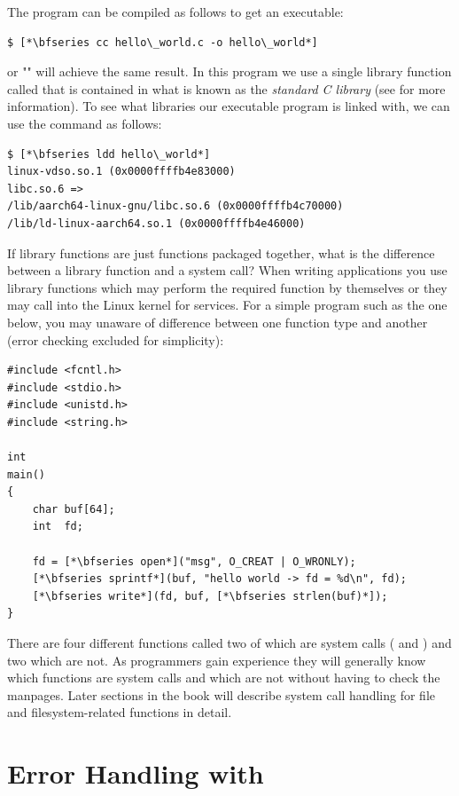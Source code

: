 \noindent
The program can be compiled as follows to get an executable:

\begin{lstlisting}
$ [*\bfseries cc hello\_world.c -o hello\_world*]
\end{lstlisting}

\noindent
or "" will achieve the same result. In this program we use a single library function called  that is contained in what is known as the \textit{standard C library} (see  for more information). To see what libraries our executable program is linked with, we can use the  command as follows:

\begin{lstlisting}
$ [*\bfseries ldd hello\_world*]
linux-vdso.so.1 (0x0000ffffb4e83000)
libc.so.6 => 
/lib/aarch64-linux-gnu/libc.so.6 (0x0000ffffb4c70000)
/lib/ld-linux-aarch64.so.1 (0x0000ffffb4e46000)
\end{lstlisting}

If library functions are just functions packaged together, what is the difference between a library function and a system call? When writing applications you use library functions which may perform the required function by themselves or they may call into the Linux kernel for services. For a simple program such as the one below, you may unaware of difference between one function type and another (error checking excluded for simplicity):

\begin{lstlisting}
#include <fcntl.h>
#include <stdio.h>
#include <unistd.h>
#include <string.h>

int
main()
{
    char buf[64];
    int  fd;

    fd = [*\bfseries open*]("msg", O_CREAT | O_WRONLY);
    [*\bfseries sprintf*](buf, "hello world -> fd = %d\n", fd);
    [*\bfseries write*](fd, buf, [*\bfseries strlen(buf)*]);
}

\end{lstlisting}

\noindent
There are four different functions called two of which are system calls ( and ) and two which are not. As programmers gain experience they will generally know which functions are system calls and which are not without having to check the manpages. Later sections in the book will describe system call handling for file and filesystem-related functions in detail.

\section{Error Handling with }

